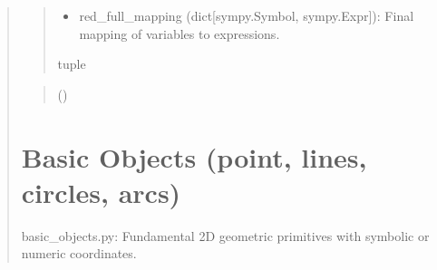 \documentclass[letterpaper,10pt,english]{sphinxmanual}
\begin{document}
\begin{quote}
\begin{fulllineitems}
\begin{fulllineitems}
\begin{quote}
\begin{description}
\begin{itemize}
\item {} 
\sphinxAtStartPar
red\_full\_mapping (dict{[}sympy.Symbol, sympy.Expr{]}): Final mapping of variables to expressions.

\end{itemize}


\sphinxAtStartPar
tuple

\end{description}\end{quote}

\end{fulllineitems}


\begin{fulllineitems}
\label{\detokenize{pygeox:pygeox.solver.SolverNamespace.substitute_in_obj}}
\pysigstartsignatures
\pysiglinewithargsret
{}
{\sphinxparamcomma {}\sphinxparamcomma {}\sphinxparamcomma {}}
{}
\pysigstopsignatures\begin{quote}\begin{description}
\sphinxAtStartPar
{} ()

\end{description}\end{quote}

\end{fulllineitems}


\end{fulllineitems}



\chapter{Basic Objects (point, lines, circles, arcs)}
\label{\detokenize{pygeox:basic-objects-point-lines-circles-arcs}}\label{\detokenize{pygeox:module-pygeox.basic_objects}}
\sphinxAtStartPar
basic\_objects.py: Fundamental 2D geometric primitives with symbolic or numeric coordinates.


\end{quote}
\end{document}
